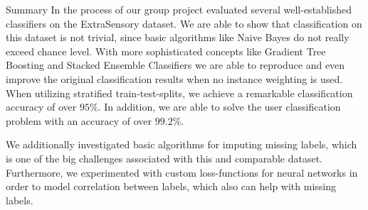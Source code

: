 \begin{section}{Summary}
	In the process of our group project evaluated several well-established classifiers on the ExtraSensory dataset. We are able to show that classification on this dataset is not trivial, since basic algorithms like Naive Bayes do not really exceed chance level. With more sophisticated concepts like Gradient Tree Boosting and Stacked Ensemble Classifiers we are able to reproduce and even improve the original classification results when no instance weighting is used. When utilizing stratified train-test-splits, we achieve a remarkable classification accuracy of over $95\%$. In addition, we are able to solve the user classification problem with an accuracy of over $99.2\%$. \par
	We additionally investigated basic algorithms for imputing missing labels, which is one of the big challenges associated with this and comparable dataset. Furthermore, we experimented with custom loss-functions for neural networks in order to model correlation between labels, which also can help with missing labels.
\end{section}